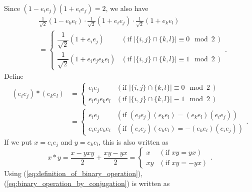 \documentclass{amsart}
\theoremstyle{definition}
\theoremstyle{remark}
\numberwithin{equation}{section}
\begin{document}
Since $(1 - e_i e_j) (1 + e_i e_j) = 2$, we also have
\begin{equation}
\label{eq:binary_operation_by_conjugation}
\begin{split}
& \frac{1}{\sqrt{2}} (1 - e_k e_l) \cdot \frac{1}{\sqrt{2}} (1 + e_i e_j) \cdot \frac{1}{\sqrt{2}} (1 + e_k e_l) \\
&= \begin{cases} 
\dfrac{1}{\sqrt{2}} (1 + e_i e_j) 
& ( \textrm{if $| \{ i, j \} \cap \{ k , l \} | \equiv 0 \mod 2$} \, ) \\
\dfrac{1}{\sqrt{2}} (1 + e_i e_j e_k e_l) 
& ( \textrm{if $| \{ i, j \} \cap \{ k , l \} | \equiv 1 \mod 2$} \, ) 
\end{cases}.
\end{split}
\end{equation}
Define
\begin{equation}
\label{eq:definition_of_binary_operation}
\begin{split}
(e_i e_j) * (e_k e_l) 
&= \begin{cases} 
e_i e_j & ( \textrm{if $| \{ i, j \} \cap \{ k , l \} | \equiv 0 \mod 2$} \, ) \\
e_i e_j e_k e_l & ( \textrm{if $| \{ i, j \} \cap \{ k , l \} | \equiv 1 \mod 2$} \, )
\end{cases} \\
&= \begin{cases} 
e_i e_j & ( \textrm{if $(e_i e_j) (e_k e_l) = (e_k e_l) (e_i e_j)$} ) \\
e_i e_j e_k e_l & ( \textrm{if $(e_i e_j) (e_k e_l) = - (e_k e_l) (e_i e_j)$} )
\end{cases}.
\end{split}
\end{equation}
If we put $x = e_i e_j$ and $y = e_k e_l$, this is also written as
\begin{equation}
\label{eq:definition_of_binary_operation_2}
x * y = \frac{x - y x y}{2} + \frac{x y - y x}{2}
= \begin{cases}
x & ( \textrm{if $x y  = y x$} ) \\
x y & ( \textrm{if $x y = - y x$} )
\end{cases}.
\end{equation}
Using (\ref{eq:definition_of_binary_operation}), 
(\ref{eq:binary_operation_by_conjugation}) is written as
\end{document}

